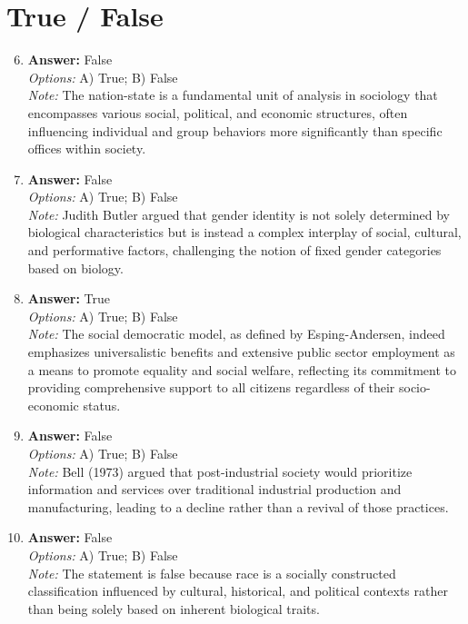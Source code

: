 \documentclass[12pt]{article}
\begin{document}
\section*{True / False}
\begin{enumerate}[label=\arabic*.]
\setcounter{enumi}{5}
\item \textbf{Answer:} False
\\ \textit{Options:} A) True; B) False
\\ \textit{Note:} The nation-state is a fundamental unit of analysis in sociology that encompasses various social, political, and economic structures, often influencing individual and group behaviors more significantly than specific offices within society.
\item \textbf{Answer:} False
\\ \textit{Options:} A) True; B) False
\\ \textit{Note:} Judith Butler argued that gender identity is not solely determined by biological characteristics but is instead a complex interplay of social, cultural, and performative factors, challenging the notion of fixed gender categories based on biology.
\item \textbf{Answer:} True
\\ \textit{Options:} A) True; B) False
\\ \textit{Note:} The social democratic model, as defined by Esping-Andersen, indeed emphasizes universalistic benefits and extensive public sector employment as a means to promote equality and social welfare, reflecting its commitment to providing comprehensive support to all citizens regardless of their socio-economic status.
\item \textbf{Answer:} False
\\ \textit{Options:} A) True; B) False
\\ \textit{Note:} Bell (1973) argued that post-industrial society would prioritize information and services over traditional industrial production and manufacturing, leading to a decline rather than a revival of those practices.
\item \textbf{Answer:} False
\\ \textit{Options:} A) True; B) False
\\ \textit{Note:} The statement is false because race is a socially constructed classification influenced by cultural, historical, and political contexts rather than being solely based on inherent biological traits.
\end{enumerate}
\end{document}
